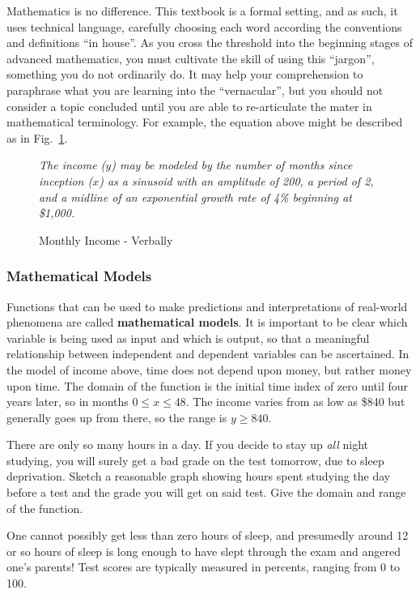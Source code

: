 Mathematics is no difference.  This textbook is a formal setting, and as such, 
it uses technical language, carefully
choosing each word according the conventions and definitions ``in house''.  
As you cross the threshold into the
beginning stages of advanced mathematics, you must cultivate the skill of 
using this ``jargon'', something you 
do not ordinarily do.  It may help your comprehension to paraphrase 
what you are learning into the ``vernacular'',
but you should not consider a topic concluded until you are able to 
re-articulate the mater in mathematical terminology.
For example, the equation above might be described as in Fig.~\ref{fig:verbally}.

\begin{figure}
\emph{The income ($y$) may be modeled by the number of months since 
inception ($x$) as a sinusoid with an amplitude of 200, a period of 2, and a
midline of an exponential growth rate of 4\% beginning at \$1,000.}
\caption{Monthly Income - Verbally\label{fig:verbally}}
\end{figure}

\subsubsection{Mathematical Models}
Functions that can be used to make predictions and 
interpretations of real-world phenomena are called \textbf{mathematical
models}.
It is important to be clear which variable is being used as input 
and which is output, so that a meaningful
relationship between independent and dependent variables 
can be ascertained.  In the model of income above,
time does not depend upon money, but rather money upon time.  
The domain of the function is the initial time
index of zero until four years later, so in months $0\le x \le 48$.  
The income varies from as low as \$840 but
generally goes up from there, so the range is $y\ge840$.

\begin{example}
	\exProblem
There are only so many hours in a day.  If you decide to stay up \emph{all} night studying, 
you will surely get
a bad grade on the test tomorrow, due to sleep deprivation.  
Sketch a reasonable graph showing hours spent studying the day before
a test and the grade you will get on said test.  Give the domain and range of the function.

	\exSolution
One cannot possibly get less than zero hours of sleep, and presumedly around 
12 or so hours of sleep is
long enough to have slept through the exam and angered one's parents!  
Test scores are typically measured in percents, ranging from 0 to 100.

\end{example}

~\vfill